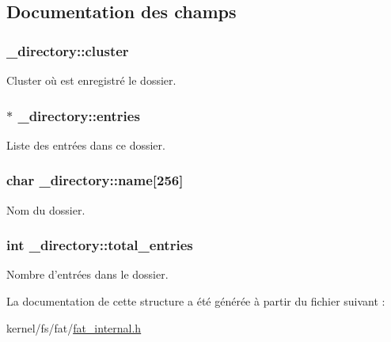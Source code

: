 \subsection{Documentation des champs}
\hypertarget{struct__directory_a5a45241095c7fb2a39f158638631ddbc}{
\subsubsection[{cluster}]{ \+\_\+directory\+::cluster}}\label{struct__directory_a5a45241095c7fb2a39f158638631ddbc}
Cluster où est enregistré le dossier. \hypertarget{struct__directory_a2aa96162372442698a14e116ce88110d}{
\subsubsection[{entries}]{$\ast$ \+\_\+directory\+::entries}}\label{struct__directory_a2aa96162372442698a14e116ce88110d}
Liste des entrées dans ce dossier. \hypertarget{struct__directory_a535c678fe29215d35ac64200865147a4}{
\subsubsection[{name}]{\setlength{\rightskip}{0pt plus 5cm}char \+\_\+directory\+::name\mbox{[}256\mbox{]}}}\label{struct__directory_a535c678fe29215d35ac64200865147a4}
Nom du dossier. \hypertarget{struct__directory_aeb73476149e19828774d4dfbd96a051f}{
\subsubsection[{total\+\_\+entries}]{\setlength{\rightskip}{0pt plus 5cm}int \+\_\+directory\+::total\+\_\+entries}}\label{struct__directory_aeb73476149e19828774d4dfbd96a051f}
Nombre d'entrées dans le dossier. 

La documentation de cette structure a été générée à partir du fichier suivant \+:\begin{DoxyCompactItemize}
\item 
kernel/fs/fat/\hyperlink{fat__internal_8h}{fat\+\_\+internal.\+h}\end{DoxyCompactItemize}
